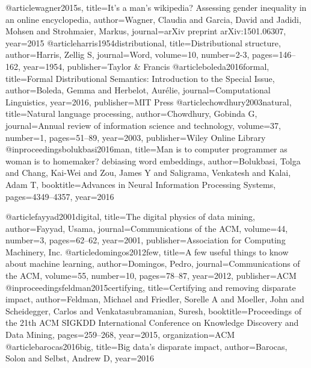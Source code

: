 @article{wagner2015s,
  title={It's a man's wikipedia? Assessing gender inequality in an online encyclopedia},
  author={Wagner, Claudia and Garcia, David and Jadidi, Mohsen and Strohmaier, Markus},
  journal={arXiv preprint arXiv:1501.06307},
  year={2015}
}
@article{harris1954distributional,
  title={Distributional structure},
  author={Harris, Zellig S},
  journal={Word},
  volume={10},
  number={2-3},
  pages={146--162},
  year={1954},
  publisher={Taylor \& Francis}
}
@article{boleda2016formal,
  title={Formal Distributional Semantics: Introduction to the Special Issue},
  author={Boleda, Gemma and Herbelot, Aur{\'e}lie},
  journal={Computational Linguistics},
  year={2016},
  publisher={MIT Press}
}
@article{chowdhury2003natural,
  title={Natural language processing},
  author={Chowdhury, Gobinda G},
  journal={Annual review of information science and technology},
  volume={37},
  number={1},
  pages={51--89},
  year={2003},
  publisher={Wiley Online Library}
}
@inproceedings{bolukbasi2016man,
  title={Man is to computer programmer as woman is to homemaker? debiasing word embeddings},
  author={Bolukbasi, Tolga and Chang, Kai-Wei and Zou, James Y and Saligrama, Venkatesh and Kalai, Adam T},
  booktitle={Advances in Neural Information Processing Systems},
  pages={4349--4357},
  year={2016}
}



@article{fayyad2001digital,
  title={The digital physics of data mining},
  author={Fayyad, Usama},
  journal={Communications of the ACM},
  volume={44},
  number={3},
  pages={62--62},
  year={2001},
  publisher={Association for Computing Machinery, Inc.}
}
@article{domingos2012few,
  title={A few useful things to know about machine learning},
  author={Domingos, Pedro},
  journal={Communications of the ACM},
  volume={55},
  number={10},
  pages={78--87},
  year={2012},
  publisher={ACM}
}
@inproceedings{feldman2015certifying,
  title={Certifying and removing disparate impact},
  author={Feldman, Michael and Friedler, Sorelle A and Moeller, John and Scheidegger, Carlos and Venkatasubramanian, Suresh},
  booktitle={Proceedings of the 21th ACM SIGKDD International Conference on Knowledge Discovery and Data Mining},
  pages={259--268},
  year={2015},
  organization={ACM}
}
@article{barocas2016big,
  title={Big data's disparate impact},
  author={Barocas, Solon and Selbst, Andrew D},
  year={2016}
}








